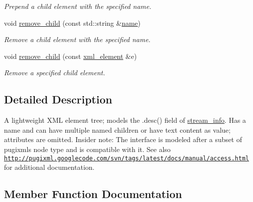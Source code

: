\begin{DoxyCompactItemize}
\begin{DoxyCompactList}\small\item\em Prepend a child element with the specified name. \end{DoxyCompactList}\item 
\mbox{\label{classlsl_1_1xml__element_ad23da57ac3a6a7f3dd849be0a8b44a47}} 
void \hyperlink{classlsl_1_1xml__element_ad23da57ac3a6a7f3dd849be0a8b44a47}{remove\+\_\+child} (const std\+::string \&\hyperlink{classlsl_1_1xml__element_a2e449e85b7e763b1d0db4bb19d2eb7c2}{name})
\begin{DoxyCompactList}\small\item\em Remove a child element with the specified name. \end{DoxyCompactList}\item 
\mbox{\label{classlsl_1_1xml__element_a0c07b18ef39b7f6d683b9612e2a9104e}} 
void \hyperlink{classlsl_1_1xml__element_a0c07b18ef39b7f6d683b9612e2a9104e}{remove\+\_\+child} (const \hyperlink{classlsl_1_1xml__element}{xml\+\_\+element} \&e)
\begin{DoxyCompactList}\small\item\em Remove a specified child element. \end{DoxyCompactList}\end{DoxyCompactItemize}


\subsection{Detailed Description}
A lightweight X\+ML element tree; models the .desc() field of \hyperlink{classlsl_1_1stream__info}{stream\+\_\+info}. Has a name and can have multiple named children or have text content as value; attributes are omitted. Insider note\+: The interface is modeled after a subset of pugixml\textquotesingle{}s node type and is compatible with it. See also \href{http://pugixml.googlecode.com/svn/tags/latest/docs/manual/access.html}{\tt http\+://pugixml.\+googlecode.\+com/svn/tags/latest/docs/manual/access.\+html} for additional documentation. 

\subsection{Member Function Documentation}
\mbox{\label{classlsl_1_1xml__element_a6a162d1b57049f5ecab6b68207a71d53}} 
